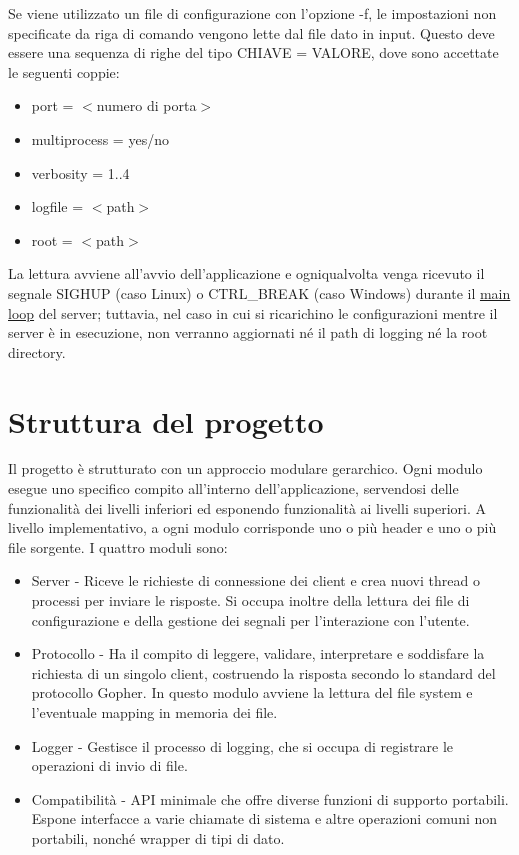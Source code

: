 \documentclass{article}
\begin{document}
Se viene utilizzato un file di configurazione con l'opzione -f, le impostazioni non specificate
da riga di comando vengono lette dal file dato in input. Questo deve essere una sequenza di righe del tipo CHIAVE = VALORE, 
dove sono accettate le seguenti coppie:
\begin{itemize}
    \item port = $<$numero di porta$>$
    \item multiprocess = yes/no
    \item verbosity = {1..4}
    \item logfile = $<$path$>$
    \item root = $<$path$>$
\end{itemize}
La lettura avviene all'avvio dell'applicazione e ogniqualvolta venga ricevuto il segnale 
SIGHUP (caso Linux) o CTRL\_BREAK (caso Windows) durante il \href{html/server_8h.html#a533c9a4292e9d1106ff7c54fbf75090a}
{main loop} del server; tuttavia, nel caso in cui si ricarichino le configurazioni mentre il server è in esecuzione,
non verranno aggiornati né il path di logging né la root directory.\\

\section{Struttura del progetto}

Il progetto è strutturato con un approccio modulare gerarchico. 
Ogni modulo esegue uno specifico compito all'interno dell'applicazione, servendosi delle funzionalità
dei livelli inferiori ed esponendo funzionalità ai livelli superiori.
A livello implementativo, a ogni modulo corrisponde uno o più header e uno o più file sorgente.
I quattro moduli sono:
\begin{itemize}
    \item Server - Riceve le richieste di connessione dei client e crea nuovi thread 
    o processi per inviare le risposte. Si occupa inoltre della lettura dei file di configurazione e 
    della gestione dei segnali per l'interazione con l'utente.
    \item Protocollo - Ha il compito di leggere, validare, interpretare e soddisfare la richiesta di un singolo client,
    costruendo la risposta secondo lo standard del protocollo Gopher. 
    In questo modulo avviene la lettura del file system e l'eventuale mapping 
    in memoria dei file.
    \item Logger - Gestisce il processo di logging, che si occupa di registrare le operazioni di invio
    di file.
    \item Compatibilità - API minimale che offre diverse funzioni di supporto portabili. Espone interfacce
    a varie chiamate di sistema e altre operazioni comuni non portabili, nonché wrapper di tipi di dato.
\end{itemize} 
\end{document}
